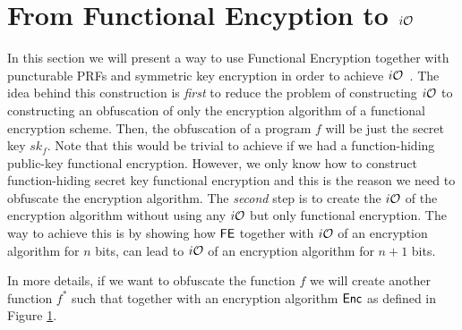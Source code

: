\section{From Functional Encyption to $i\mathcal{O}$}
\label{sec:iO-FE}

In this section we will present a way to use Functional Encryption together with puncturable PRFs and symmetric key encryption in order to achieve $i\mathcal{O}$~\cite{iO-FE}. The idea behind this construction is \emph{first} to reduce the problem of constructing $i\mathcal{O}$ to constructing an obfuscation of only the encryption algorithm of a functional encryption scheme. Then, the obfuscation of a program $f$ will be just the secret key $sk_f$. Note that this would be trivial to achieve if we had a function-hiding public-key functional encryption. However, we only know how to construct function-hiding secret key functional encryption and this is the reason we need to obfuscate the encryption algorithm. The \emph{second} step is to create the $i\mathcal{O}$ of the encryption algorithm without using any $i\mathcal{O}$ but only functional encryption. The way to achieve this is by showing how $\mathsf{FE}$ together with $i\mathcal{O}$ of an encryption algorithm for $n$ bits, can lead to $i\mathcal{O}$ of an encryption algorithm for $n+1$ bits.

In more details, if we want to obfuscate the function $f$ we will create another function $f^*$ such that together with an encryption algorithm $\mathsf{Enc}$ as defined in Figure \ref{fig:enc}.
\begin{figure}[!h]
	
\centering
{}
\hfill
\centering
{}
\caption{}
\label{fig:enc}
\end{figure}

